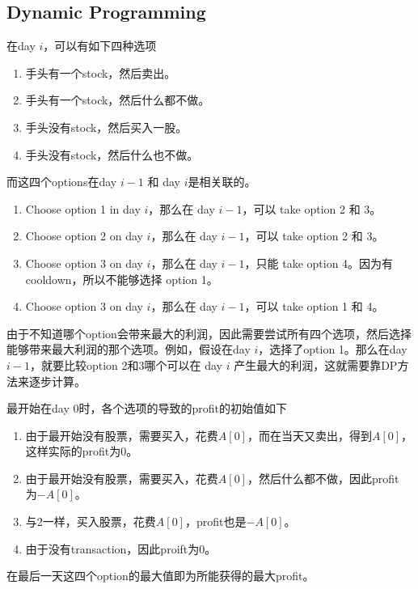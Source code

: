 \subsection{Dynamic Programming}
在day $ i $，可以有如下四种选项
\begin{enumerate}
\item 手头有一个stock，然后卖出。
\item 手头有一个stock，然后什么都不做。
\item 手头没有stock，然后买入一股。
\item 手头没有stock，然后什么也不做。
\end{enumerate}
而这四个options在day $ i-1 $ 和 day $ i $是相关联的。
\begin{enumerate}
\item Choose option 1 in day $ i $，那么在 day $ i-1 $，可以 take option 2 和 3。
\item Choose option 2 on day $ i $，那么在 day $ i-1 $，可以 take option 2 和 3。
\item Choose option 3 on day $ i $，那么在 day $ i-1 $，只能 take option 4。因为有cooldown，所以不能够选择 option 1。
\item Choose option 3 on day $ i $，那么在 day $ i-1 $，可以 take option 1 和 4。
\end{enumerate}
由于不知道哪个option会带来最大的利润，因此需要尝试所有四个选项，然后选择能够带来最大利润的那个选项。例如，假设在day $ i $，选择了option 1。那么在day $ i-1 $，就要比较option 2和3哪个可以在 day $ i $ 产生最大的利润，这就需要靠DP方法来逐步计算。
\par
最开始在day 0时，各个选项的导致的profit的初始值如下
\begin{enumerate}
\item 由于最开始没有股票，需要买入，花费$A[0]$，而在当天又卖出，得到$A[0]$，这样实际的profit为0。
\item 由于最开始没有股票，需要买入，花费$A[0]$，然后什么都不做，因此profit 为$-A[0]$。
\item 与2一样，买入股票，花费$A[0]$，profit也是$-A[0]$。
\item 由于没有transaction，因此proift为0。
\end{enumerate}
在最后一天这四个option的最大值即为所能获得的最大profit。
\setcounter{algorithm}{0}
